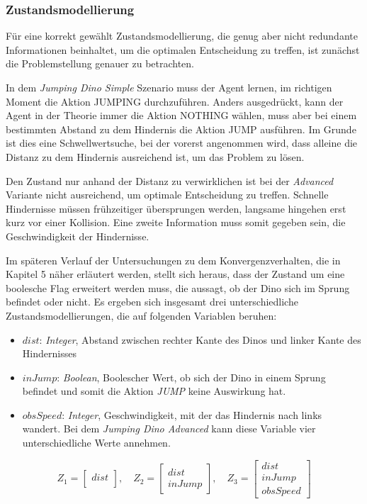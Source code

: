 \subsubsection{Zustandsmodellierung}
Für eine korrekt gewählt Zustandsmodellierung, die genug aber nicht redundante Informationen beinhaltet, um die optimalen Entscheidung zu treffen, ist zunächst die Problemstellung genauer zu betrachten. 
\par 
In dem \textit{Jumping Dino Simple} Szenario muss der Agent lernen, im richtigen Moment die Aktion JUMPING durchzuführen. Anders ausgedrückt, kann der Agent in der Theorie immer die Aktion NOTHING wählen, muss aber bei einem bestimmten Abstand zu dem Hindernis die Aktion JUMP ausführen. Im Grunde ist dies eine Schwellwertsuche, bei der vorerst angenommen wird, dass alleine die Distanz zu dem Hindernis ausreichend ist, um das Problem zu lösen.
\par 
Den Zustand nur anhand der Distanz zu verwirklichen ist bei der \textit{Advanced} Variante nicht ausreichend, um optimale Entscheidung zu treffen. Schnelle Hindernisse müssen frühzeitiger übersprungen werden, langsame hingehen erst kurz vor einer Kollision. Eine zweite Information muss somit gegeben sein, die Geschwindigkeit der Hindernisse.
\par 
Im späteren Verlauf der Untersuchungen zu dem Konvergenzverhalten, die in Kapitel 5 näher erläutert werden, stellt sich heraus, dass der Zustand um eine boolesche Flag erweitert werden muss, die aussagt, ob der Dino sich im Sprung befindet oder nicht. 
Es ergeben sich insgesamt drei unterschiedliche Zustandsmodellierungen, die auf folgenden Variablen beruhen:
\begin{itemize}
 \item $dist$: \textit{Integer}, Abstand zwischen rechter Kante des Dinos und  linker Kante des Hindernisses
 \item $inJump$: \textit{Boolean}, Boolescher Wert, ob sich der Dino in einem Sprung befindet und somit die Aktion \textit{JUMP} keine Auswirkung hat.
 \item $obsSpeed$: \textit{Integer}, Geschwindigkeit, mit der das Hindernis nach links wandert. Bei dem \textit{Jumping Dino Advanced} kann diese Variable vier unterschiedliche Werte annehmen.    
\end{itemize}
\begin{equation}
    Z_{1} =  \begin{bmatrix} dist\\   \end{bmatrix}, \quad
    Z_{2} =  \begin{bmatrix} dist \\ inJump   \end{bmatrix}, \quad
    Z_{3} =  \begin{bmatrix} dist \\ inJump \\ obsSpeed   \end{bmatrix}
\end{equation}

